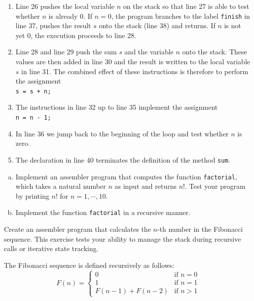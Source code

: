 \begin{enumerate}
\item Line 26 pushes the local variable $n$ on the stack so that line 27 is able to test whether $n$
      is already $0$.  If $n = 0$, the program branches to the label \texttt{finish} in line 37,
      pushes the result $s$ onto the stack (line 38) and returns.  If $n$ is not yet $0$, the
      execution proceeds to line 28.
\item Line 28 and line 29 push the sum $s$ and the variable $n$ onto the stack.  These
      values are then added in line 30 and the result is written to the local variable $s$ in line 31.
      The combined effect of these instructions is therefore to perform the assignment
      \\[0.2cm]
      \hspace*{1.3cm}
      \texttt{s = s + n;}
\item The instructions in line 32 up to line 35 implement the assignment 
      \\[0.2cm]
      \hspace*{1.3cm}
      \texttt{n = n - 1;}
\item In line 36 we jump back to the beginning of the loop and test whether $n$ is zero.  
\item The declaration in line 40 terminates the definition of the method \texttt{sum}.
\end{enumerate}

\exerciseEng
\begin{enumerate}[(a)]
\item Implement an assembler program that computes the function \texttt{factorial}, which takes a natural
      number $n$ as input and returns $n!$.  Test your program by printing
      $n!$ for $n = 1, \cdots, 10$.
\item Implement the function \texttt{factorial} in a recursive manner.
\end{enumerate}

\exerciseEng
Create an assembler program that calculates the $n$-th number in the Fibonacci sequence.
This exercise tests your ability to manage the stack during recursive calls or iterative state tracking.

The Fibonacci sequence is defined recursively as follows:
\begin{equation*}
    F(n) = 
    \begin{cases} 
        0 & \text{if } n = 0 \\
        1 & \text{if } n = 1 \\
        F(n-1) + F(n-2) & \text{if } n > 1
    \end{cases}
\end{equation*}



